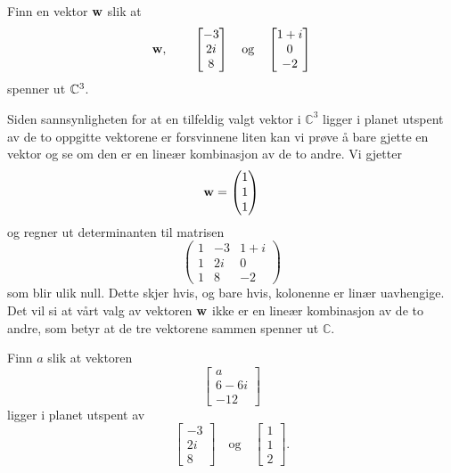 \begin{oppgave}
Finn en vektor $\mathbf{w}$ slik at
\[
\mathbf{w},
\quad 
\text{}
\quad 
\begin{bmatrix}
-3 \\ 2i \\ 8 
\end{bmatrix}
\quad 
\text{og}
\quad 
\begin{bmatrix}
1+i \\ 0 \\ -2 
\end{bmatrix}
\]
spenner ut $\mathbb{C}^3$.
\end{oppgave}

\begin{losning}
	Siden sannsynligheten for at en tilfeldig valgt vektor i $\mathbb{C}^3$ ligger i planet utspent av de to oppgitte vektorene er forsvinnene liten kan vi prøve å bare gjette en vektor og se om den er en lineær kombinasjon av de to andre. Vi gjetter
	\begin{equation*}
		\mathbf{w}= \begin{pmatrix} 1 \\ 1 \\ 1 \end{pmatrix}
	\end{equation*}
	og regner ut determinanten til matrisen
	\begin{equation*}
		\begin{pmatrix}
			1 & -3 & 1 + i 	\\
			1 & 2i & 0 		\\
			1 & 8 & -2 		
		\end{pmatrix}
	\end{equation*}
	som blir ulik null. Dette skjer hvis, og bare hvis, kolonenne er linær uavhengige. Det vil si at vårt valg av vektoren $\mathbf{w}$ ikke er en lineær kombinasjon av de to andre, som betyr at de tre vektorene sammen spenner ut $\mathbb{C}$.
\end{losning}


\begin{oppgave}
Finn $a$ slik at vektoren 
\[
\begin{bmatrix}
a \\ 6-6i \\ -12 
\end{bmatrix}
\]
ligger i planet utspent av 
\[
\begin{bmatrix}
-3 \\ 2i \\ 8 
\end{bmatrix}
\quad 
\text{og}
\quad 
\begin{bmatrix}
1 \\ 1 \\ 2 
\end{bmatrix}.
\]

\end{oppgave}


